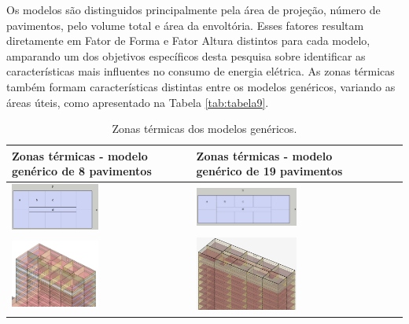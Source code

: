 \noindent Os modelos são distinguidos principalmente pela área de projeção, número de pavimentos, pelo volume total e área da envoltória. Esses fatores resultam diretamente em Fator de Forma e Fator Altura distintos para cada modelo, amparando um dos objetivos específicos desta pesquisa sobre identificar as características mais influentes no consumo de energia elétrica. As zonas térmicas também formam características distintas entre os modelos genéricos, variando as áreas úteis, como apresentado na Tabela \ref{tab:tabela9}.
\begin{table}[H]
    \centering
    \caption{\small Zonas térmicas dos modelos genéricos.}
    \begin{tabular*}{\columnwidth}{@{\extracolsep{\fill}}ll}\hline
        \makecell[c]{Zonas térmicas - modelo\\ genérico de 8 pavimentos}                    & \makecell[c]{Zonas térmicas - modelo \\genérico de 19 pavimentos}                 \\ \hline
        \includegraphics[width=0.5\textwidth]{figures/tab9-pb-8pav.png}                     & \includegraphics[width=0.5\textwidth]{figures/tab9-pb-19pav.png}                  \\
        \includegraphics[width=0.5\textwidth]{figures/tab9-CEP_8pav-v3-7.png}               & \includegraphics[width=0.5\textwidth]{figures/tab9-corte-19pav-v1.png}            \\ \hline

\end{tabular*}
\end{table}
